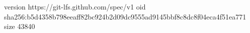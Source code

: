 version https://git-lfs.github.com/spec/v1
oid sha256:b5d4358b798eeaff82bc924b2d09dc9555ad9145bbf8c8dc8f04eca4f51ea771
size 43840
